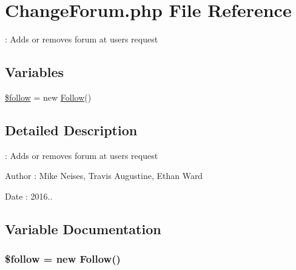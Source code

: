 \hypertarget{_change_forum_8php}{}\section{Change\+Forum.\+php File Reference}
\label{_change_forum_8php}


\+: Adds or removes forum at user\textquotesingle{}s request  


\subsection*{Variables}
\begin{DoxyCompactItemize}
\item 
\hyperlink{_change_forum_8php_ab5929d3bc848873a208b38b88e7b226c}{\$follow} = new \hyperlink{class_follow}{Follow}()
\end{DoxyCompactItemize}


\subsection{Detailed Description}
\+: Adds or removes forum at user\textquotesingle{}s request 

\begin{DoxyAuthor}{Author}
\+: Mike Neises, Travis Augustine, Ethan Ward 
\end{DoxyAuthor}
\begin{DoxyDate}{Date}
\+: 2016.. 
\end{DoxyDate}


\subsection{Variable Documentation}
\subsubsection[{\texorpdfstring{\$follow}{$follow}}]{\setlength{\rightskip}{0pt plus 5cm}\$follow = new {\bf Follow}()}\hypertarget{_change_forum_8php_ab5929d3bc848873a208b38b88e7b226c}{}\label{_change_forum_8php_ab5929d3bc848873a208b38b88e7b226c}
